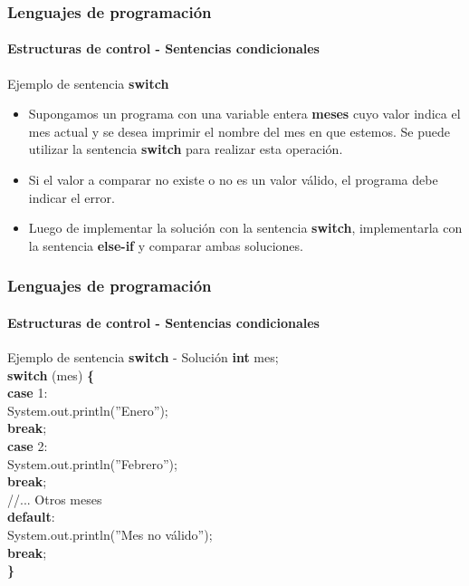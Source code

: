 \documentclass{beamer}
\begin{document}
		\begin{frame}
			\frametitle{Lenguajes de programaci\'on}
			\framesubtitle{Estructuras de control - Sentencias condicionales}

			\begin{block}{Ejemplo de sentencia \textbf{switch}}
				\begin{itemize}
					\item Supongamos un programa con una variable entera \textbf{meses} cuyo valor indica el mes actual y se desea imprimir el nombre del mes en que estemos. Se puede utilizar la sentencia \textbf{switch} para realizar esta operaci\'on.
					\item Si el valor a comparar no existe o no es un valor v\'alido, el programa debe indicar el error.
					\item Luego de implementar la soluci\'on con la sentencia \textbf{switch}, implementarla con la sentencia \textbf{else-if} y comparar ambas soluciones. 
				\end{itemize}
			\end{block}
		\end{frame}

		\begin{frame}
			\frametitle{Lenguajes de programaci\'on}
			\framesubtitle{Estructuras de control - Sentencias condicionales}

			\begin{block}{Ejemplo de sentencia \textbf{switch} - Soluci\'on}
			{\scriptsize
				\textbf{int} mes;\\
				\vspace{0.3cm}
				\textbf{switch} (mes) \textbf{\{} \\
				\hspace{0.3cm} \textbf{case} 1: \\
				\hspace{0.6cm} System.out.println(''Enero''); \\
				\hspace{0.6cm} \textbf{break}; \\
				\hspace{0.3cm} \textbf{case} 2: \\
				\hspace{0.6cm} System.out.println(''Febrero''); \\
				\hspace{0.6cm} \textbf{break}; \\
				\hspace{0.3cm} //... Otros meses \\
				\hspace{0.3cm} \textbf{default}: \\
				\hspace{0.6cm} System.out.println(''Mes no v\'alido''); \\
				\hspace{0.6cm} \textbf{break}; \\
				\textbf{\}}
			}
			\end{block}
		\end{frame}
\end{document}

